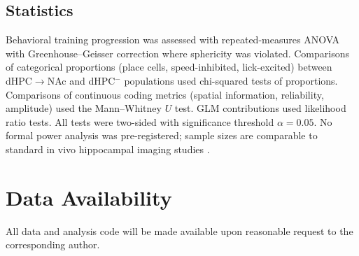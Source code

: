\documentclass[11pt]{article}
\begin{document}
\subsection{Statistics}

Behavioral training progression was assessed with repeated-measures ANOVA with Greenhouse--Geisser correction where sphericity was violated. Comparisons of categorical proportions (place cells, speed-inhibited, lick-excited) between dHPC$\to$NAc and dHPC$^-$ populations used chi-squared tests of proportions. Comparisons of continuous coding metrics (spatial information, reliability, amplitude) used the Mann--Whitney $U$ test. GLM contributions used likelihood ratio tests. All tests were two-sided with significance threshold $\alpha=0.05$. No formal power analysis was pre-registered; sample sizes are comparable to standard in vivo hippocampal imaging studies \citep{harvey2009intracellular,dombeck2010functional,danielson2016sublayer}.

\section{Data Availability}
All data and analysis code will be made available upon reasonable request to the corresponding author.



\end{document}
